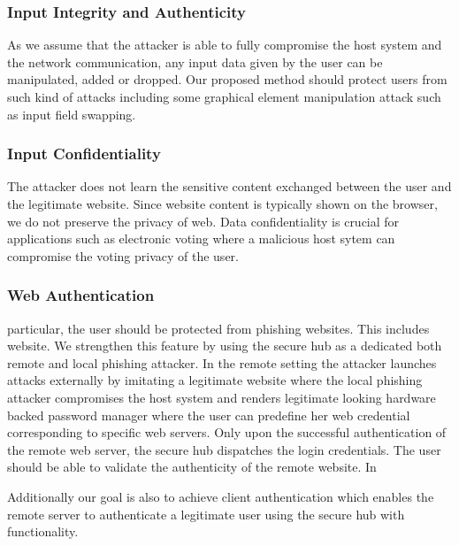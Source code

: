 \subsubsection{Input Integrity and Authenticity}

As we assume that the attacker is able to fully compromise the host system and the network communication, any input data given by the user can be manipulated, added or dropped. Our proposed method should protect users from such kind of attacks including some graphical element manipulation attack such as input field swapping. 


\subsubsection{Input Confidentiality}

The attacker does not learn the sensitive content exchanged between the user and the legitimate website. Since website content is typically shown on the browser, we do not preserve the privacy of web. Data confidentiality is crucial for applications such as electronic voting where a malicious host sytem can compromise the voting privacy of the user.


\subsubsection{Web Authentication}

particular, the user should be protected from phishing websites. This includes
website. We strengthen this feature by using the secure hub as a dedicated
both remote and local phishing attacker. In the remote setting the attacker
launches attacks externally by imitating a legitimate website where the local
phishing attacker compromises the host system and renders legitimate looking
hardware backed password manager where the user can predefine her web credential
corresponding to specific web servers. Only upon the successful authentication
of the remote web server, the secure hub dispatches the login credentials.
The user should be able to validate the authenticity of the remote website. In
 
Additionally our goal is also to achieve client authentication which enables the remote server to authenticate a legitimate user using the secure hub with \webusb functionality.


\iffalse
\subsubsection{Side channel resiliency}

The system should be resilient from the side channel attacks such as power analysis, timing analysis that may reveal sensitive input from the users.
\fi

